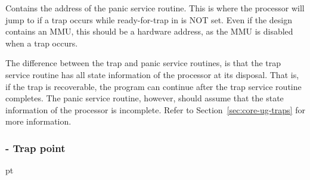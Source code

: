 \normalsize\vskip 6pt
\noindent Contains the address of the panic service routine. This is where the processor
will jump to if a trap occurs while ready-for-trap in  is NOT set.
Even if the design contains an MMU, this should be a hardware address, as the
MMU is disabled when a trap occurs.

The difference between the trap and panic service routines, is that the trap
service routine has all state information of the processor at its disposal. That
is, if the trap is recoverable, the program can continue after the trap service
routine completes. The panic service routine, however, should assume that the
state information of the processor is incomplete. Refer to
Section~\ref{sec:core-ug-traps} for more information.
\subsubsection[CR\_TP - Trap point]{ - Trap point}
\label{reg:TP}
\label{reg:TP}
 pt\relax\noindent\footnotesize
